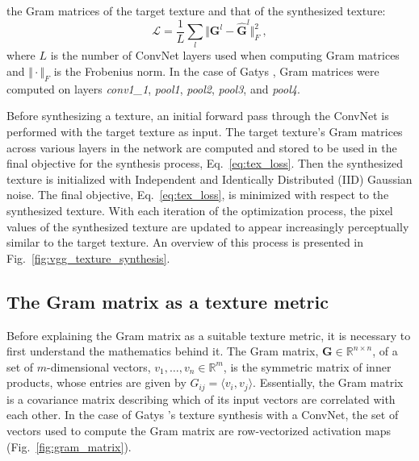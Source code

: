 the Gram matrices of the target texture and that of the synthesized texture:
\begin{equation}
   \mathcal{L} = \frac{1}{L} \sum_{l} \Vert \mathbf{G}^l - \hat{\mathbf{G}}^l \Vert^2_F\ ,
   \label{eq:tex_loss}
\end{equation}
where $L$ is the number of ConvNet layers used when computing Gram matrices
and $\Vert \cdot \Vert_F$ is the Frobenius norm. In the case of Gatys \etal \cite{gatys2015}, Gram matrices were computed on
layers \emph{conv1\_1}, \emph{pool1}, \emph{pool2}, \emph{pool3}, and \emph{pool4}.

Before synthesizing a texture, an initial forward pass through the ConvNet is
performed with the target texture as input. The target texture's Gram matrices
across various layers in the network are computed and stored to be used in the final objective for
the synthesis process, Eq.\ \ref{eq:tex_loss}. Then the synthesized texture is initialized with Independent and Identically Distributed (IID)
Gaussian noise. The final
objective, Eq.\ \ref{eq:tex_loss}, is minimized with respect to the synthesized texture. With each
iteration of the optimization process, the pixel values of the synthesized texture are updated to appear increasingly
perceptually similar to the target texture. An overview of this process is presented in Fig.\ \ref{fig:vgg_texture_synthesis}.
\clearpage

\clearpage

\subsection{The Gram matrix as a texture metric}

Before explaining the Gram matrix as a suitable texture metric, it is necessary to first understand the mathematics behind it. The Gram matrix, $\mathbf{G} \in \mathbb{R}^{n \times n}$, of a set of $m$-dimensional vectors, $v_1, \dots , v_n \in \mathbb{R}^m$, is the symmetric matrix of inner products, whose entries are given by $G_{ij} = \langle v_i, v_j \rangle$. Essentially, the Gram matrix is a covariance matrix describing which of its input vectors are correlated with each other. In the case of Gatys \etal's \cite{gatys2015} texture synthesis with a ConvNet, the set of vectors used to compute the Gram matrix are row-vectorized activation maps (Fig.\ \ref{fig:gram_matrix}).


